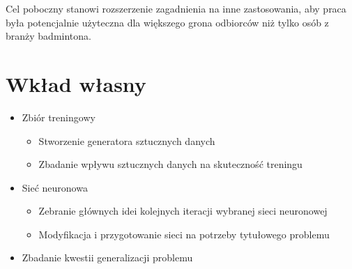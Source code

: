 Cel poboczny stanowi rozszerzenie zagadnienia na inne zastosowania, aby praca była potencjalnie użyteczna dla większego grona odbiorców niż tylko osób z branży badmintona.
\\

\section{Wkład własny}

\begin{itemize}
	\item Zbiór treningowy
		\begin{itemize}
			\item Stworzenie generatora sztucznych danych 
			\item Zbadanie wpływu sztucznych danych na skuteczność treningu 
		\end{itemize}
	\item Sieć neuronowa
	\begin{itemize}
		\item Zebranie głównych idei kolejnych iteracji wybranej sieci neuronowej 
		\item Modyfikacja i przygotowanie sieci na potrzeby tytułowego problemu 
	\end{itemize}
	\item Zbadanie kwestii generalizacji problemu 
\end{itemize}
